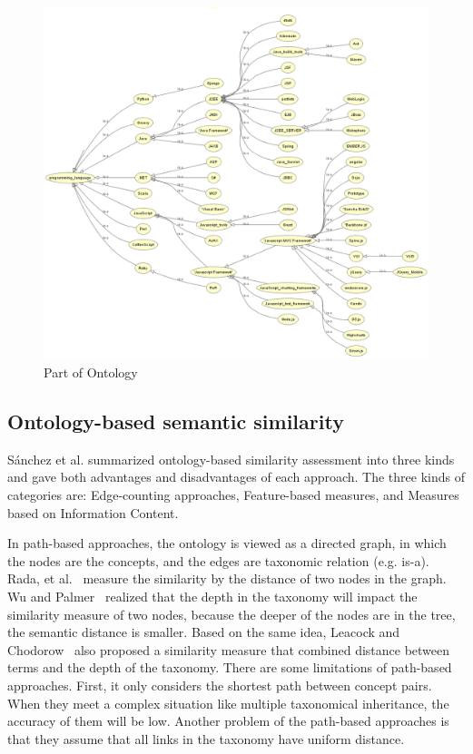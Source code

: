 \begin{figure}[htbp]
  \includegraphics[scale=0.6]{images/ontology_pro.png}
  \caption{Part of Ontology}
  \label{fig:ontology_pro}
\end{figure}

\subsection{Ontology-based semantic similarity}

S{\'a}nchez et al. \cite{sanchez2012ontology} summarized ontology-based similarity assessment into three kinds and gave both advantages and disadvantages of each approach. The three kinds of categories are: Edge-counting approaches, Feature-based measures, and Measures based on Information Content.

In path-based approaches, the ontology is viewed as a directed graph, in which the nodes are the concepts, and the edges are taxonomic relation (e.g. is-a). Rada, et al.~\cite{rada1989development} measure the similarity by the distance of two nodes in the graph. Wu and Palmer~\cite{wu1994verbs} realized that the depth in the taxonomy will impact the similarity measure of two nodes, because the deeper of the nodes are in the tree, the semantic distance is smaller. Based on the same idea, Leacock and Chodorow~\cite{leacock1998combining} also proposed a similarity measure that combined distance   between terms and the depth of the taxonomy. There are some limitations of path-based approaches. First, it only considers the shortest path between concept pairs. When they meet a complex situation like multiple taxonomical inheritance, the accuracy of them will be low. Another problem of the path-based approaches is that they assume that all links in the taxonomy have uniform distance.


